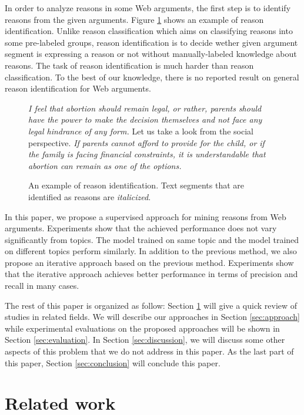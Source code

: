 \documentclass[11pt,a4paper]{article}
\begin{document}
In order to analyze reasons in some Web arguments, the first step is to identify reasons from the given arguments. Figure \ref{figure:reasonidentification} shows an example of reason identification. Unlike reason classification which aims on classifying reasons into some pre-labeled groups\cite{hasan2014you}, reason identification is to decide wether given argument segment is expressing a reason or not without manually-labeled knowledge about reasons. The task of reason identification is much harder than reason classification. To the best of our knowledge, there is no reported result on general reason identification for Web arguments.


\begin{figure}

{\it I feel that abortion should remain legal, or rather, parents should have the power to make the decision themselves and not face any legal hindrance of any form.} Let us take a look from the social perspective. {\it If parents cannot afford to provide for the child, or if the family is facing financial constraints, it is understandable that abortion can remain as one of the options.}


\caption{An example of reason identification. Text segments that are identified as reasons are {\it italicized}.} 
\label{figure:reasonidentification}
\end{figure}

In this paper, we propose a supervised approach for mining reasons from Web arguments. Experiments show that the achieved performance does not vary significantly from topics. The model trained on same topic and the model trained on different topics perform similarly. In addition to the previous method, we also propose an iterative approach based on the previous method. Experiments show that the iterative approach achieves better performance in terms of precision and recall in many cases. 

The rest of this paper is organized as follow: Section \ref{sec:related} will give a quick review of studies in related fields. We will describe our approaches in Section \ref{sec:approach} while experimental evaluations on the proposed approaches will be shown in Section \ref{sec:evaluation}. In Section \ref{sec:discussion}, we will discuss some other aspects of this problem that we do not address in this paper. As the last part of this paper, Section \ref{sec:conclusion} will conclude this paper.



\section{Related work}
\label{sec:related}
\end{document}
